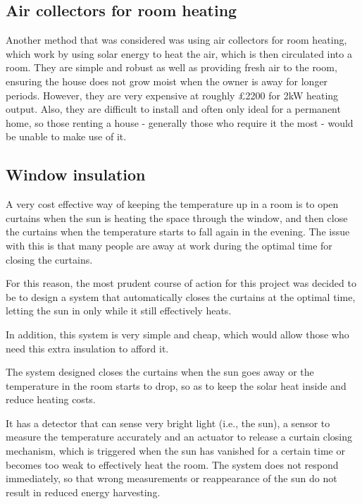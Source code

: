 \documentclass[a4paper,12pt]{article}
\begin{document}
\subsection{Air collectors for room heating}

Another method that was considered was using air collectors for room heating, which work by using solar energy to heat the air, which is then circulated into a room. 
They are simple and robust as well as providing fresh air to the room, ensuring the house does not grow moist when the owner is away for longer periods. 
However, they are very expensive at roughly £2200 for 2kW heating output\cite{url:solarVenti}. Also, they are difficult to install and often only ideal for a permanent home, 
so those renting a house - generally those who require it the most - would be unable to make use of it.

\subsection{Window insulation}

A very cost effective way of keeping the temperature up in a room is to open curtains when the sun is heating the space through the window, 
and then close the curtains when the temperature starts to fall again in the evening. 
The issue with this is that many people are away at work during the optimal time for closing the curtains.

For this reason, the most prudent course of action for this project was decided to be to design a system that automatically closes the curtains at the optimal time, 
letting the sun in only while it still effectively heats. 

In addition, this system is very simple and cheap, which would allow those who need this extra insulation to afford it.

The system designed closes the curtains when the sun goes away or the temperature in the room starts to drop, so as to keep the solar heat inside 
and reduce heating costs.

It has a detector that can sense very bright light (i.e., the sun), a sensor to measure the temperature accurately and an actuator to 
release a curtain closing mechanism, which is triggered when the sun has vanished for a certain time or becomes too weak to effectively heat the room.
 The system does not respond immediately, so that wrong measurements or reappearance of the sun do not result in reduced energy harvesting.
\end{document}
